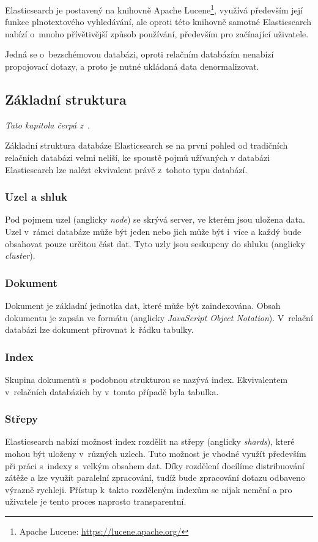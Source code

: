 Elasticsearch je postavený na knihovně Apache Lucene\footnote{Apache Lucene: \url{https://lucene.apache.org/}}, využívá především její funkce plnotextového vyhledávání, ale oproti této knihovně samotné Elasticsearch nabízí o~mnoho přívětivější způsob používání, především pro začínající uživatele. 

Jedná se o~bezschémovou databázi, oproti relačním databázím nenabízí propojovací dotazy, a proto je nutné ukládaná data denormalizovat.

\subsection{Základní struktura}
\emph{Tato kapitola čerpá z~\cite{bib:elastic-concept}}.

Základní struktura databáze Elasticsearch se na první pohled od tradičních relačních databázi velmi neliší, ke spoustě pojmů užívaných v databázi Elasticsearch lze nalézt ekvivalent právě z~tohoto typu databází.

\subsubsection*{Uzel a shluk}
Pod pojmem uzel (anglicky \emph{node}) se skrývá server, ve kterém jsou uložena data. Uzel v~rámci databáze může být jeden nebo jich může být i~více a každý bude obsahovat pouze určitou část dat. Tyto uzly jsou seskupeny do shluku (anglicky \emph{cluster}).

\subsubsection*{Dokument}\label{section:dokument}
Dokument je základní jednotka dat, které může být zaindexována. Obsah dokumentu je zapsán ve formátu (anglicky \emph{JavaScript Object Notation}). V~relační databázi lze dokument přirovnat k~řádku tabulky.

\subsubsection*{Index}\label{section:index}
Skupina dokumentů s~podobnou strukturou se nazývá index. Ekvivalentem v~relačních databázích by v~tomto případě byla tabulka.

\subsubsection*{Střepy}
Elasticsearch nabízí možnost index rozdělit na střepy (anglicky \emph{shards}), které mohou být uloženy v~různých uzlech. Tuto možnost je vhodné využít především při práci s~indexy s~velkým obsahem dat. Díky rozdělení docílíme distribuování zátěže a lze využít paralelní zpracování, tudíž bude zpracování dotazu odbaveno výrazně rychleji. 
Přístup k~takto rozděleným indexům se nijak nemění a pro uživatele je tento proces naprosto transparentní.

